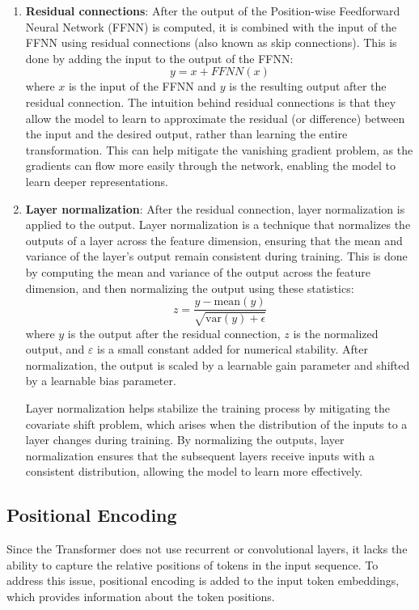 \documentclass[12pt]{article}
\begin{document}
\begin{enumerate}
	\item {\textbf{Residual connections}: After the output of the Position-wise Feedforward Neural Network (FFNN) is computed, it is combined with the input of the FFNN using residual connections (also known as skip connections). This is done by adding the input to the output of the FFNN:
	$$y = x + FFNN(x) $$
	where $x$ is the input of the FFNN and $y$ is the resulting output after the residual connection. The intuition behind residual connections is that they allow the model to learn to approximate the residual (or difference) between the input and the desired output, rather than learning the entire transformation. This can help mitigate the vanishing gradient problem, as the gradients can flow more easily through the network, enabling the model to learn deeper representations.
	}
	\item {\textbf{Layer normalization}: After the residual connection, layer normalization is applied to the output. Layer normalization is a technique that normalizes the outputs of a layer across the feature dimension, ensuring that the mean and variance of the layer's output remain consistent during training. This is done by computing the mean and variance of the output across the feature dimension, and then normalizing the output using these statistics:
$$z = \frac{y - \text{mean}(y)}{\sqrt{\text{var}(y) + \epsilon}}$$
where $y$ is the output after the residual connection, $z$ is the normalized output, and $\varepsilon$ is a small constant added for numerical stability. After normalization, the output is scaled by a learnable gain parameter and shifted by a learnable bias parameter.

Layer normalization helps stabilize the training process by mitigating the covariate shift problem, which arises when the distribution of the inputs to a layer changes during training. By normalizing the outputs, layer normalization ensures that the subsequent layers receive inputs with a consistent distribution, allowing the model to learn more effectively.}
\end{enumerate}

\subsection{Positional Encoding}

Since the Transformer does not use recurrent or convolutional layers, it lacks the ability to capture the relative positions of tokens in the input sequence. To address this issue, positional encoding is added to the input token embeddings, which provides information about the token positions.
\end{document}
